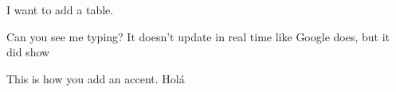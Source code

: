 
I want to add a table.

Can you see me typing? It doesn't update in real time like Google does, but it did show 

This is how you add an accent. Holá
